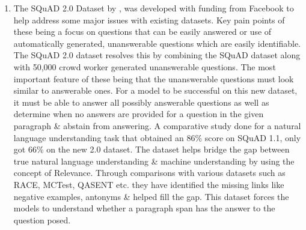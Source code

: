 \documentclass[11pt]{article}
\begin{document}
	\begin{enumerate}
		\item The SQuAD 2.0 Dataset by \citep{dataset}, was developed with funding from Facebook to help address some major issues with existing datasets. Key pain points of these being a focus on questions that can be easily answered or use of automatically generated, unanswerable questions which are easily identifiable.\\
		The SQuAD 2.0 dataset resolves this by combining the SQuAD dataset along with 50,000 crowd worker generated unanswerable questions. The most important feature of these being that the unanswerable questions must look similar to answerable ones. For a model to be successful on this new dataset, it must be able to answer all possibly answerable questions as well as determine when no answers are provided for a question in the given paragraph \& abstain from answering. A comparative study done for a natural language understanding task that obtained an 86\% score on SQuAD 1.1, only got 66\% on the new 2.0 dataset.
		The dataset helps bridge the gap between true natural language understanding \& machine understanding by using the concept of Relevance. Through comparisons with various datasets such as RACE, MCTest, QASENT etc. they have identified the missing links like negative examples, antonyms \& helped fill the gap. This dataset forces the models to understand whether a paragraph span has the answer to the question posed. 
		

\end{enumerate}
\end{document}
